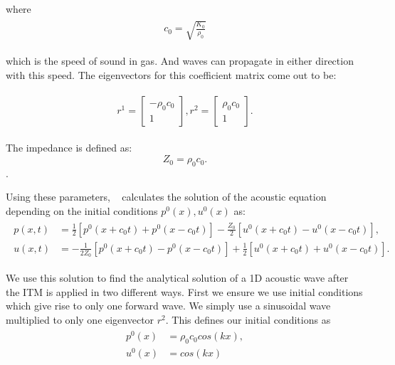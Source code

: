 where 
\begin{align}
    \begin{split}
        c_0 = \sqrt{\frac{K_0}{\rho_0}}
    \end{split}
\end{align}

which is the speed of sound in gas. And waves can propagate in either direction with this speed. The eigenvectors for this coefficient matrix come out to be:

\begin{align}
    \begin{split}
        r^1 = \begin{bmatrix}
            -\rho_0 c_0 \\
            1
        \end{bmatrix}, 
        r^2 = \begin{bmatrix}
            \rho_0 c_0 \\
            1
        \end{bmatrix}.
    \end{split}
\end{align}

The impedance is defined as:
\begin{equation}
    Z_0 = \rho_0 c_0.
\end{equation}.

Using these parameters, ~\parencite[Sec. 2.8]{leveque_2002} calculates the solution of the acoustic equation depending on the initial conditions $p^0(x), u^0(x)$ as:
\begin{align}
    \begin{split}
        p(x,t) &= \frac{1}{2}\left[p^0\left(x + c_0t\right) + p^0\left(x - c_0t\right)\right] - \frac{Z_0}{2}\left[u^0\left(x+c_0t\right) - u^0\left(x-c_0t\right)\right], \\
        u(x,t) &= -\frac{1}{2Z_0}\left[p^0\left(x+c_0t\right) - p^0\left(x-c_0t\right)\right] + \frac{1}{2}\left[u^0\left(x+c_0t\right) + u^0\left(x-c_0t\right)\right] .
    \end{split}
    \label{eq:solutionacoustic}
\end{align}

We use this solution to find the analytical solution of a 1D acoustic wave after the \ac{ITM} is applied in two different ways. First we ensure we use initial conditions which give rise to only one forward wave. We simply use a sinusoidal wave multiplied to only one eigenvector $r^2$.
This defines our initial conditions as
\begin{align}
    \begin{split}
        p^0\left(x\right) &= \rho_0c_0cos\left(kx\right), \\
        u^0\left(x\right) &= cos\left(kx\right)
    \end{split}
    \label{eq:initialconditions}
\end{align}

